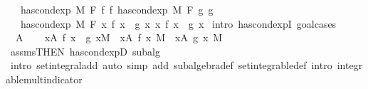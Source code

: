 \begin{isabellebody}
\ \ \ {\isachardoublequoteopen}has{\isacharunderscore}{\kern0pt}cond{\isacharunderscore}{\kern0pt}exp\ M\ F\ f\ f{\isacharprime}{\kern0pt}{\isachardoublequoteclose}\ {\isachardoublequoteopen}has{\isacharunderscore}{\kern0pt}cond{\isacharunderscore}{\kern0pt}exp\ M\ F\ g\ g{\isacharprime}{\kern0pt}{\isachardoublequoteclose}\isanewline
\ \ \ {\isachardoublequoteopen}has{\isacharunderscore}{\kern0pt}cond{\isacharunderscore}{\kern0pt}exp\ M\ F\ {\isacharparenleft}{\kern0pt}{\isasymlambda}x{\isachardot}{\kern0pt}\ f\ x\ {\isacharplus}{\kern0pt}\ g\ x{\isacharparenright}{\kern0pt}\ {\isacharparenleft}{\kern0pt}{\isasymlambda}x{\isachardot}{\kern0pt}\ f{\isacharprime}{\kern0pt}\ x\ {\isacharplus}{\kern0pt}\ g{\isacharprime}{\kern0pt}\ x{\isacharparenright}{\kern0pt}{\isachardoublequoteclose}\isanewline
%
\isadelimproof
%
\endisadelimproof
%
\isatagproof
{}\isamarkupfalse%
\ {\isacharparenleft}{\kern0pt}intro\ has{\isacharunderscore}{\kern0pt}cond{\isacharunderscore}{\kern0pt}expI{\isacharprime}{\kern0pt}{\isacharcomma}{\kern0pt}\ goal{\isacharunderscore}{\kern0pt}cases{\isacharparenright}{\kern0pt}\isanewline
\ \ \isamarkupfalse%
\ {\isacharparenleft}{\kern0pt}{}\ A{\isacharparenright}{\kern0pt}\isanewline
\ \ \isamarkupfalse%
\ {\isachardoublequoteopen}{\isasymintegral}x{\isasymin}A{\isachardot}{\kern0pt}\ {\isacharparenleft}{\kern0pt}f\ x\ {\isacharplus}{\kern0pt}\ g\ x{\isacharparenright}{\kern0pt}{\isasympartial}M\ {\isacharequal}{\kern0pt}\ {\isacharparenleft}{\kern0pt}{\isasymintegral}x{\isasymin}A{\isachardot}{\kern0pt}\ f\ x\ {\isasympartial}M{\isacharparenright}{\kern0pt}\ {\isacharplus}{\kern0pt}\ {\isacharparenleft}{\kern0pt}{\isasymintegral}x{\isasymin}A{\isachardot}{\kern0pt}\ g\ x\ {\isasympartial}M{\isacharparenright}{\kern0pt}{\isachardoublequoteclose}\ \isamarkupfalse%
\ assms{\isacharbrackleft}{\kern0pt}THEN\ has{\isacharunderscore}{\kern0pt}cond{\isacharunderscore}{\kern0pt}expD{\isacharparenleft}{\kern0pt}{}{\isacharparenright}{\kern0pt}{\isacharbrackright}{\kern0pt}\ subalg\ {}\ \isamarkupfalse%
\ {\isacharparenleft}{\kern0pt}intro\ set{\isacharunderscore}{\kern0pt}integral{\isacharunderscore}{\kern0pt}add{\isacharparenleft}{\kern0pt}{}{\isacharparenright}{\kern0pt}{\isacharcomma}{\kern0pt}\ auto\ simp\ add{\isacharcolon}{\kern0pt}\ subalgebra{\isacharunderscore}{\kern0pt}def\ set{\isacharunderscore}{\kern0pt}integrable{\isacharunderscore}{\kern0pt}def\ intro{\isacharcolon}{\kern0pt}\ integrable{\isacharunderscore}{\kern0pt}mult{\isacharunderscore}{\kern0pt}indicator{\isacharparenright}{\kern0pt}\isanewline

\end{isabellebody}
